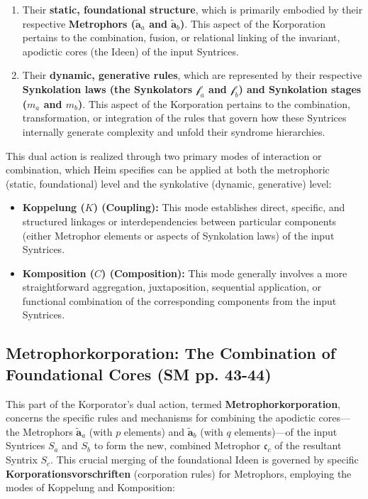 \documentclass[
    12pt,              %
    a4paper,           %
    headings=normal,   %
    twoside=true,      %
    BCOR=8mm,          %
]{scrbook}
\newcommand{\metrophor}{\bm{\widetilde{a}}}
\newcommand{\synkolator}{\mathcal{f}}
\newcommand{\synkolationsstufe}{m}
\begin{document}
\begin{enumerate}[label=(\roman*)]
    \item  Their \textbf{static, foundational structure}, which is primarily embodied by their respective \textbf{Metrophors (\(\metrophor_a\) and \(\metrophor_b\))}. This aspect of the Korporation pertains to the combination, fusion, or relational linking of the invariant, apodictic cores (the Ideen) of the input Syntrices.
    \item  Their \textbf{dynamic, generative rules}, which are represented by their respective \textbf{Synkolation laws (the Synkolators \(\synkolator_a\) and \(\synkolator_b\)) and Synkolation stages (\(\synkolationsstufe_a\) and \(\synkolationsstufe_b\))}. This aspect of the Korporation pertains to the combination, transformation, or integration of the rules that govern how these Syntrices internally generate complexity and unfold their syndrome hierarchies.
\end{enumerate}
This dual action is realized through two primary modes of interaction or combination, which Heim specifies can be applied at both the metrophoric (static, foundational) level and the synkolative (dynamic, generative) level:

\begin{itemize}
    \item   \textbf{Koppelung (\(K\)) (Coupling):} This mode establishes direct, specific, and structured linkages or interdependencies between particular components (either Metrophor elements or aspects of Synkolation laws) of the input Syntrices.
    \item   \textbf{Komposition (\(C\)) (Composition):} This mode generally involves a more straightforward aggregation, juxtaposition, sequential application, or functional combination of the corresponding components from the input Syntrices.
\end{itemize}

\subsection{Metrophorkorporation: The Combination of Foundational Cores (SM pp. 43-44)}
\label{sec:ch3_metrophorkorporation_original} 

This part of the Korporator’s dual action, termed \textbf{Metrophorkorporation}, concerns the specific rules and mechanisms for combining the apodictic cores—the Metrophors \(\metrophor_a\) (with \(p\) elements) and \(\metrophor_b\) (with \(q\) elements)—of the input Syntrices \(S_a\) and \(S_b\) to form the new, combined Metrophor \(\mathfrak{c}_c\) of the resultant Syntrix \(S_c\). This crucial merging of the foundational Ideen is governed by specific \textbf{Korporationsvorschriften} (corporation rules) for Metrophors, employing the modes of Koppelung and Komposition:
\end{document}
